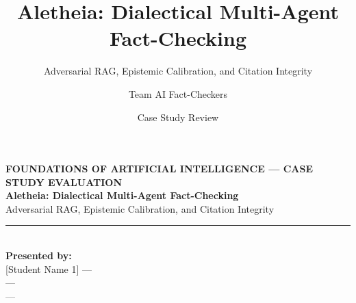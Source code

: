 \documentclass[aspectratio=169, 10pt]{beamer}
\title{Aletheia: Dialectical Multi-Agent Fact-Checking}
\subtitle{Adversarial RAG, Epistemic Calibration, and Citation Integrity}
\author{Team AI Fact-Checkers}
\institute{Course: Foundations of Artificial Intelligence (FAI)}
\date{Case Study Review}
\begin{document}
\begin{frame}[plain]
    \vspace{1.2cm}
    \begin{center}
        {\scriptsize\textbf{\color{BlueAccent}FOUNDATIONS OF ARTIFICIAL INTELLIGENCE --- CASE STUDY EVALUATION}}\\[0.25cm]
        {\LARGE\textbf{\color{NavyDark}Aletheia: Dialectical Multi-Agent Fact-Checking}}\\[0.2cm]
        {\normalsize\color{TextMuted}Adversarial RAG, Epistemic Calibration, and Citation Integrity}\\[0.4cm]
        
        \vspace{0.1cm}
        {\color{BlueAccent}\rule{3.5cm}{1.2pt}}\\[0.6cm]
        
        {\small\textbf{\color{NavyDark}Presented by:}}\\[0.15cm]
        {\small\color{TextMain}
        [Student Name 1] \quad---\\
        [Student Name 2] \quad---\\
        [Student Name 3] \quad---
        }
    \end{center}
\end{frame}
\end{document}
